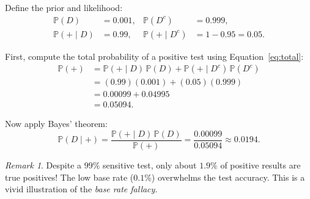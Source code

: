 \documentclass{article}
\theoremstyle{remark}
\newtheorem*{remark}{Remark}
\newenvironment{sub}{%
  \begin{list}{}{%
    \setlength{\leftmargin}{4em}%
    \setlength{\rightmargin}{0pt}%
    \setlength{\topsep}{0pt}%
    \setlength{\partopsep}{0pt}%
    \setlength{\parsep}{\parskip}%
    \setlength{\itemsep}{\parskip}%
  }\item\relax
}{\end{list}}
\newcommand{\Prob}{\mathbb{P}}
\newcommand{\given}{\mid}
\begin{document}
\begin{sub}
Define the prior and likelihood:
\begin{align*}
  \Prob(D)   &= 0.001,  &  \Prob(D^c) &= 0.999, \\
  \Prob(+ \given D)   &= 0.99,  &
  \Prob(+ \given D^c) &= 1 - 0.95 = 0.05.
\end{align*}

First, compute the total probability of a positive test using
Equation~\eqref{eq:total}:
\begin{align*}
  \Prob(+)
    &= \Prob(+ \given D)\,\Prob(D)
     + \Prob(+ \given D^c)\,\Prob(D^c) \\
    &= (0.99)(0.001) + (0.05)(0.999) \\
    &= 0.00099 + 0.04995 \\
    &= 0.05094.
\end{align*}

Now apply Bayes' theorem:
\[
  \Prob(D \given +)
  = \frac{\Prob(+ \given D)\,\Prob(D)}{\Prob(+)}
  = \frac{0.00099}{0.05094}
  \approx \boxed{0.0194}.
\]

\begin{remark}
  Despite a $99\%$ sensitive test, only about $1.9\%$ of positive results
  are true positives! The low base rate ($0.1\%$) overwhelms the test
  accuracy. This is a vivid illustration of the \emph{base rate fallacy}.
\end{remark}

\end{sub}

\end{document}
